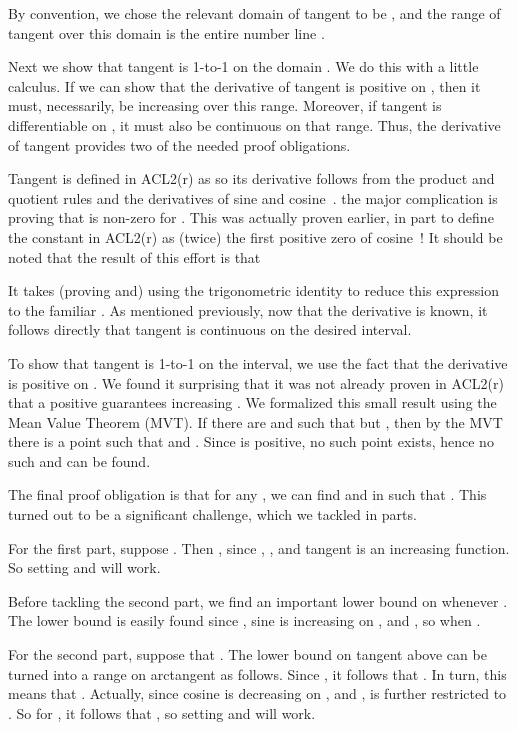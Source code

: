 \documentclass[copyright,creativecommons]{eptcs}
\begin{document}
By convention, we chose the relevant domain of tangent to be , and the range of tangent over this domain is the entire
number line . 

Next we show that tangent is 1-to-1 on the domain . We do this with a little calculus. If we can show that the
derivative of tangent is positive on , then it must,
necessarily, be increasing over this range. Moreover, if tangent is
differentiable on , it must also be continuous on
that range. Thus, the derivative of tangent provides two of the needed
proof obligations.

Tangent is defined in ACL2(r) as  so its derivative follows from the product and
quotient
rules and the derivatives of sine and
cosine~\cite{GaCo:chain-rule,ReGa:automatic-differentiator}. the major
complication is proving that  is non-zero for . This was actually proven earlier, in part to define the 
constant  in ACL2(r) as (twice) the first positive zero of
cosine~\cite{Gam:dissertation}!  It should be noted that the result of
this effort is that

It takes (proving and) using the trigonometric identity  to reduce this expression to the familiar . As mentioned previously, now that the derivative is known,
it follows directly that tangent is continuous on the desired interval.

To show that tangent is 1-to-1 on the interval, we use the fact that
the derivative  is positive on . We found it surprising that it was not already proven in
ACL2(r) that a positive  guarantees increasing . We
formalized this small result using the Mean Value Theorem
(MVT). If there are  and  such that 
but , then by the MVT there is a point  such that
 and . Since
 is positive, no such point  exists, hence no such  and
 can be found.

The final proof obligation is that for any , we can
find  and  in  such that .  This turned out to be a significant challenge, which we
tackled in parts.

For the first part, suppose . Then , since , , and tangent is 
an increasing function. So setting  and  will work.

Before tackling the second part, we find an important lower bound on
 whenever . The lower bound is easily 
found since , sine is increasing on , and , so  when .

For the second part, suppose that .
The lower bound on tangent above can be turned into a range on arctangent as
follows.  Since , it follows that . In turn, this means that .  Actually,
since cosine is decreasing on , and
,  is further restricted to .  So for , it follows that 
, so setting
 and  will work.
\end{document}

